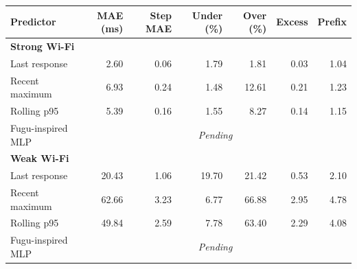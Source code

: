 \begin{tabular}{lrrrrrr}
\toprule
Predictor & MAE (ms) & Step MAE & Under (\%) & Over (\%) & Excess & Prefix \\
\midrule
\multicolumn{7}{l}{\textbf{Strong Wi-Fi}} \\
Last response & 2.60 & 0.06 & 1.79 & 1.81 & 0.03 & 1.04 \\
Recent maximum & 6.93 & 0.24 & 1.48 & 12.61 & 0.21 & 1.23 \\
Rolling p95 & 5.39 & 0.16 & 1.55 & 8.27 & 0.14 & 1.15 \\
Fugu-inspired MLP & \multicolumn{6}{c}{\textit{Pending}} \\
\midrule
\multicolumn{7}{l}{\textbf{Weak Wi-Fi}} \\
Last response & 20.43 & 1.06 & 19.70 & 21.42 & 0.53 & 2.10 \\
Recent maximum & 62.66 & 3.23 & 6.77 & 66.88 & 2.95 & 4.78 \\
Rolling p95 & 49.84 & 2.59 & 7.78 & 63.40 & 2.29 & 4.08 \\
Fugu-inspired MLP & \multicolumn{6}{c}{\textit{Pending}} \\
\bottomrule
\end{tabular}
